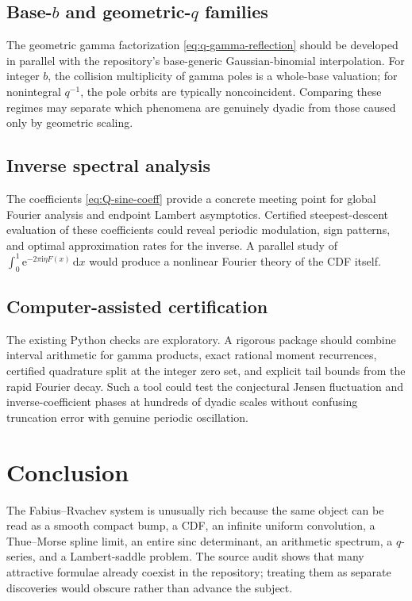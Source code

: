 \documentclass[11pt,oneside]{article}
\theoremstyle{definition}
\theoremstyle{remark}
\newcommand{\e}{\mathrm e}
\newcommand{\ii}{\mathrm i}
\newcommand{\dd}{\,\mathrm d}
\begin{document}
\subsection{Base-\texorpdfstring{$b$}{b} and geometric-\texorpdfstring{$q$}{q} families}

The geometric gamma factorization \eqref{eq:q-gamma-reflection} should be developed in
parallel with the repository's base-generic Gaussian-binomial interpolation.  For integer
$b$, the collision multiplicity of gamma poles is a whole-base valuation; for nonintegral
$q^{-1}$, the pole orbits are typically noncoincident.  Comparing these regimes may separate
which phenomena are genuinely dyadic from those caused only by geometric scaling.

\subsection{Inverse spectral analysis}

The coefficients \eqref{eq:Q-sine-coeff} provide a concrete meeting point for global Fourier
analysis and endpoint Lambert asymptotics.  Certified steepest-descent evaluation of these
coefficients could reveal periodic modulation, sign patterns, and optimal approximation
rates for the inverse.  A parallel study of
\(
 \int_0^1\e^{-2\pi\ii\eta F(x)}\dd x
\)
would produce a nonlinear Fourier theory of the CDF itself.

\subsection{Computer-assisted certification}

The existing Python checks are exploratory.  A rigorous package should combine interval
arithmetic for gamma products, exact rational moment recurrences, certified quadrature split
at the integer zero set, and explicit tail bounds from the rapid Fourier decay.  Such a tool
could test the conjectural Jensen fluctuation and inverse-coefficient phases at hundreds of
dyadic scales without confusing truncation error with genuine periodic oscillation.

\section{Conclusion}

The Fabius--Rvachev system is unusually rich because the same object can be read as a smooth
compact bump, a CDF, an infinite uniform convolution, a Thue--Morse spline limit, an entire
sinc determinant, an arithmetic spectrum, a $q$-series, and a Lambert-saddle problem.  The
source audit shows that many attractive formulae already coexist in the repository; treating
them as separate discoveries would obscure rather than advance the subject.
\end{document}
